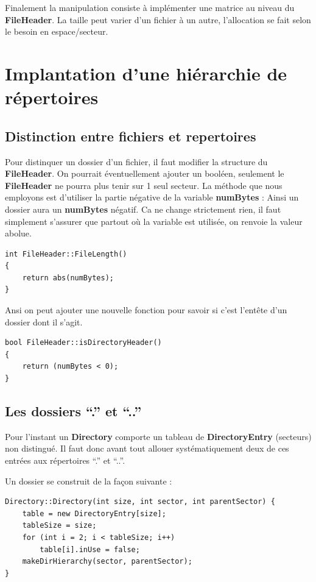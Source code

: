 \documentclass[a4paper,10pt]{article}
\begin{document}
Finalement la manipulation consiste à implémenter une matrice au niveau du
\textbf{FileHeader}. La taille peut varier d'un fichier à un autre,
l'allocation se fait selon le besoin en espace/secteur.


\section{Implantation d’une hiérarchie de répertoires}

\subsection{Distinction entre fichiers et repertoires}
Pour distinquer un dossier d'un fichier, il faut modifier la structure du
\textbf{FileHeader}. On pourrait éventuellement ajouter un booléen, seulement
le \textbf{FileHeader} ne pourra plus tenir sur 1 seul secteur. La méthode que
nous employons est d'utiliser la partie négative de la variable
\textbf{numBytes} : Ainsi un dossier aura un \textbf{numBytes} négatif. Ca ne
change strictement rien, il faut simplement s'assurer que partout où la
variable est utilisée, on renvoie la valeur abolue.

\begin{lstlisting}
int FileHeader::FileLength()
{
    return abs(numBytes);
}
\end{lstlisting}

Ansi on peut ajouter une nouvelle fonction pour savoir si c'est l'entête d'un
dossier dont il s'agit.

\begin{lstlisting}
bool FileHeader::isDirectoryHeader()
{
    return (numBytes < 0);
}
\end{lstlisting}


\subsection{Les dossiers ``.'' et ``..''}

Pour l'instant un \textbf{Directory} comporte un tableau de
\textbf{DirectoryEntry} (secteurs) non distingué. Il faut donc avant tout
allouer systématiquement deux de ces entrées aux répertoires ``.'' et ``..''.

Un dossier se construit de la façon suivante :

\begin{lstlisting}
Directory::Directory(int size, int sector, int parentSector) {
    table = new DirectoryEntry[size];
    tableSize = size;
    for (int i = 2; i < tableSize; i++)
        table[i].inUse = false;
    makeDirHierarchy(sector, parentSector);
}
\end{lstlisting}
\end{document}
